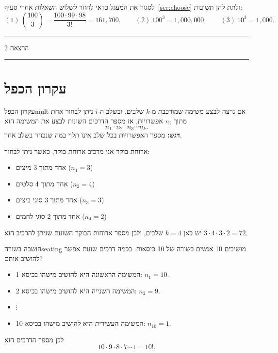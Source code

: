 \documentclass[11pt,a4paper]{report}
\newcommand{\flag}{\tikz[baseline=-0.1ex,x=0.9ex,y=0.9ex]{\draw[line width=0.5pt] (0,-0.3)--(0,1.6); \fill (0,1.6)--(1.2,1.2)--(0,0.8)--cycle;}}
\newcounter{todo}
\newcommand{\addtodo}[1]{\refstepcounter{todo}%
  \addcontentsline{tdo}{todo}{\protect\numberline{\thetodo}#1}}
\newcommand{\needcheck}[1]{\addtodo{#1}%
  {\color{todoc}\sffamily\small\,[\textbf{\flag{}\,\thetodo\ לבדיקה:} #1]\,}}
\renewcommand{\needcheck}[1]{}
\newcommand{\lecture}[1]{\par\medskip
  \begin{center}\color{exc}\sffamily\small
  \rule[0.5ex]{0.25\linewidth}{0.4pt}\quad הרצאה #1\quad\rule[0.5ex]{0.25\linewidth}{0.4pt}
  \end{center}\par}
\begin{document}
\begin{suggestion}{לסגור את המעגל}
כדאי לחזור לשלוש השאלות אחרי סעיף~\ref{sec:choose} ולתת להן תשובות:
\[
  (1)\ \binom{100}{3}=\frac{100\cdot 99\cdot 98}{3!}=161{,}700,\qquad
  (2)\ 100^3=1{,}000{,}000,\qquad
  (3)\ 10^3=1{,}000.
\]
\end{suggestion}

\lecture{2}

\section{עקרון הכפל}

\begin{principle}{עקרון הכפל}{mult}
אם נרצה לבצע משימה שמורכבת מ-$k$ שלבים, ובשלב ה-$i$ ניתן לבחור אחת מתוך $n_i$ אפשרויות, אז מספר הדרכים השונות לבצע את המשימה הוא
\[
  n_1\cdot n_2\cdot n_3\cdots n_k.
\]
\textbf{דגש:} מספר האפשרויות בכל שלב אינו תלוי במה שנבחר בשלב אחר.
\end{principle}
\needcheck{ברשימות נכתב "אחת מתוך $n_k$", ותיקנתי ל-$n_i$. כמו כן, יש לוודא את פענוח פריטי הארוחה בדוגמה הבאה (מיצים / סלטים / ביצים / לחמים)}

\begin{example}{ארוחת בוקר}{}
אני מרכיב ארוחת בוקר, כאשר ניתן לבחור:
\begin{itemize}
  \item אחד מתוך 3 מיצים \hfill ($n_1=3$)
  \item אחד מתוך 4 סלטים \hfill ($n_2=4$)
  \item אחד מתוך 3 סוגי ביצים \hfill ($n_3=3$)
  \item אחד מתוך 2 סוגי לחמים \hfill ($n_4=2$)
\end{itemize}
יש כאן $k=4$ שלבים, ולכן מספר ארוחות הבוקר השונות שניתן להרכיב הוא
$3\cdot4\cdot3\cdot2=72$.
\end{example}

\begin{example}{הושבה בשורה}{seating}
מושיבים 10 אנשים בשורה של 10 כיסאות. בכמה דרכים שונות אפשר להושיב אותם?
\begin{itemize}
  \item המשימה הראשונה היא להושיב מישהו בכיסא 1: \quad $n_1=10$.
  \item המשימה השנייה היא להושיב מישהו בכיסא 2: \quad $n_2=9$.
  \item[] \hfill$\vdots$\hfill\null
  \item המשימה העשירית היא להושיב מישהו בכיסא 10: \quad $n_{10}=1$.
\end{itemize}
לכן מספר הדרכים הוא
\[
  10\cdot9\cdot8\cdot7\cdots1=10!.
\]
\end{example}
\end{document}
